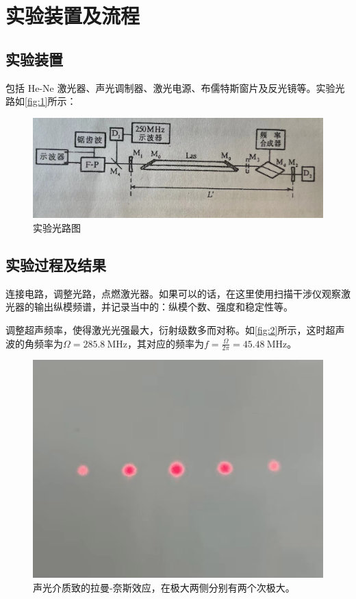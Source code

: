 \documentclass[font=default]{mpltx}
\newcommand{\note}[1]{{\color{gray}#1}}
\begin{document}
\section{实验装置及流程}
\subsection{实验装置}
包括 He-Ne 激光器、声光调制器、激光电源、布儒特斯窗片及反光镜等。实验光路如\autoref{fig:1}所示：

\begin{figure}
    \centering
    \includegraphics[width=0.85\linewidth]{fig/1.jpg}
    \caption{实验光路图}
    \label{fig:1}
\end{figure}

\subsection{实验过程及结果}
连接电路，调整光路，点燃激光器。\note{如果可以的话，在这里使用扫描干涉仪观察激光器的输出纵模频谱，并记录当中的：纵模个数、强度和稳定性等。}\par
调整超声频率，使得激光光强最大，衍射级数多而对称。如\autoref{fig:2}所示，这时超声波的角频率为$\Omega=\qty{285.8}{\MHz}$，其对应的频率为$f=\frac{\Omega}{2\pi}=\qty{45.48}{\MHz}$。

\begin{figure}
    \centering
    \includegraphics[width=0.45\linewidth]{fig/2.jpg}
    \caption{声光介质致的拉曼-奈斯效应，在极大两侧分别有两个次极大。}
    \label{fig:2}
\end{figure}
\end{document}
